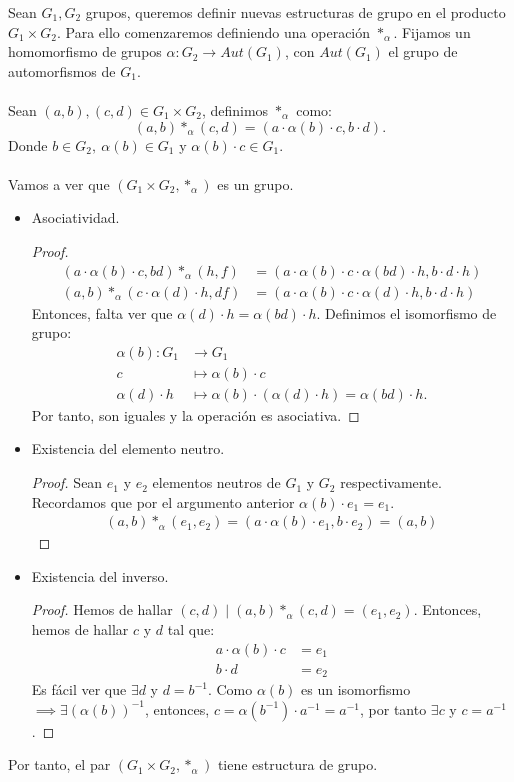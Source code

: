 Sean $G_1, G_2$ grupos, queremos definir nuevas estructuras de grupo en el producto $G_1 \times G_2$.
Para ello comenzaremos definiendo una operación $\ast_\alpha$. Fijamos un homomorfismo de grupos $\alpha:G_2 \longrightarrow Aut(G_1)$, con $Aut(G_1)$ el grupo de automorfismos de $G_1$.\\\\
Sean $(a,b),(c,d) \in G_1\times G_2$, definimos $\ast_\alpha$ como:
\[
	(a,b)\ast_\alpha(c,d) = (a\cdot\alpha(b)\cdot c, b\cdot d).
\]
Donde $b\in G_2,\ \alpha(b) \in G_1$ y $\alpha(b)\cdot c \in G_1$.\\\\
Vamos a ver que $(G_1 \times G_2, \ast_\alpha)$ es un grupo.
\begin{itemize}
	\item Asociatividad.
		\begin{proof}
			\begin{align*}
				(a\cdot\alpha(b)\cdot c, bd) \ast_\alpha (h,f) &= (a\cdot\alpha(b)\cdot c\cdot \alpha(bd)\cdot h, b\cdot d\cdot h)\\
				(a,b)\ast_\alpha(c\cdot\alpha(d)\cdot h, df) &= (a\cdot\alpha(b)\cdot c\cdot \alpha(d)\cdot h, b\cdot d\cdot h)
			\end{align*}
			Entonces, falta ver que $\alpha(d)\cdot h = \alpha(bd)\cdot h$. Definimos el isomorfismo de grupo:
			\begin{align*}
				\alpha(b) : G_1 &\longrightarrow G_1\\
				c &\longmapsto \alpha(b)\cdot c\\
				\alpha(d)\cdot h &\longmapsto \alpha(b)\cdot(\alpha(d)\cdot h) = \alpha(bd) \cdot h.
			\end{align*}
			Por tanto, son iguales y la operación es asociativa.
		\end{proof}	
	\item Existencia del elemento neutro.
		\begin{proof}
			Sean $e_1$ y $e_2$ elementos neutros de $G_1$ y $G_2$ respectivamente. Recordamos que por el argumento anterior $\alpha(b)\cdot e_1 = e_1$.
			\begin{align*}
				(a,b) \ast_\alpha (e_1, e_2) = (a \cdot \alpha(b) \cdot e_1, b \cdot e_2) = (a,b)
			\end{align*}
		\end{proof}
	\item Existencia del inverso.
		\begin{proof}
			Hemos de hallar $(c,d) \mid (a,b)\ast_\alpha(c,d) = (e_1,e_2)$.  Entonces, hemos de hallar $c$ y $d$ tal que:
			\begin{align*}
				a \cdot \alpha(b) \cdot c &= e_1\\
				b \cdot d &= e_2
			\end{align*}
			Es fácil ver que $\exists d$ y $d = b^{-1}$. Como $\alpha(b)$ es un isomorfismo $\implies \exists (\alpha(b))^{-1}$, entonces, $c = \alpha(b^{-1}) \cdot a^{-1} = a^{-1}$, por tanto $\exists c$ y $c = a^{-1}$.
		\end{proof}
		
\end{itemize}
Por tanto, el par $(G_1 \times G_2, \ast_\alpha)$ tiene estructura de grupo.\\

